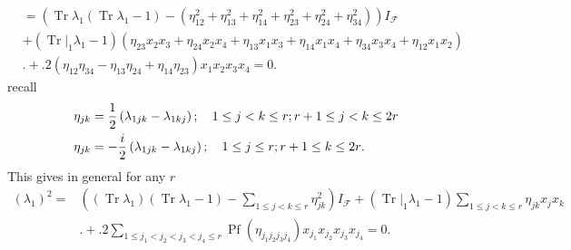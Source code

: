 \documentclass[aps, preprint]{revtex4}
\begin{document}
\begin{align} &  =\left (\ensuremath{\operatorname*{Tr}}\lambda _{1} \left (\ensuremath{\operatorname*{Tr}}\lambda _{1} -1\right ) -\left (\eta _{1 2}^{2} +\eta _{1 3}^{2} +\eta _{1 4}^{2} +\eta _{2 3}^{2} +\eta _{2 4}^{2} +\eta _{3 4}^{2}\right )\right ) I_{\mathcal{F}} \nonumber  \\
 &  +\left (\left .\ensuremath{\operatorname*{Tr}}\right \vert _{1} \lambda _{1} -1\right ) \left (\eta _{2 3} x_{2} x_{3} +\eta _{2 4} x_{2} x_{4} +\eta _{1 3} x_{1} x_{3} +\eta _{1 4} x_{1} x_{4} +\eta _{3 4} x_{3} x_{4} +\eta _{1 2} x_{1} x_{2}\right ) \nonumber  \\
 & . +.2 \left (\eta _{1 2} \eta _{3 4} -\eta _{1 3} \eta _{2 4} +\eta _{1 4} \eta _{2 3}\right ) x_{1} x_{2} x_{3} x_{4} =0.\end{align}recall
\begin{align}\eta _{j k} &  =\frac{1}{2} \left (\lambda _{1 j k} -\lambda _{1 k j}\right ) ;\text{\quad }1 \leq j <k \leq r ;r +1 \leq j <k \leq 2 r \\
\eta _{j k} &  = -\frac{i}{2} \left (\lambda _{1 j k} -\lambda _{1 k j}\right ) ;\text{\quad }1 \leq j \leq r ;r +1 \leq k \leq 2 r\text{.}\end{align}This gives in general for any $r$
\begin{align}\left (\lambda _{1}\right )^{2} = & \left (\left (\ensuremath{\operatorname*{Tr}}\lambda _{1}\right ) \left (\ensuremath{\operatorname*{Tr}}\lambda _{1} -1\right ) -\sum _{1 \leq j <k \leq r}\eta _{j k}^{2}\right ) I_{\mathcal{F}} +\left (\left .\ensuremath{\operatorname*{Tr}}\right \vert _{1} \lambda _{1} -1\right ) \sum _{1 \leq j <k \leq r}\eta _{j k} x_{j} x_{k} \nonumber  \\
 & . +.2 \sum _{1 \leq j_{1} <j_{2} <j_{3} <j_{4} \leq r}\ensuremath{\operatorname*{Pf}} \left (\eta _{j_{1} j_{2} j_{3} j_{4}}\right ) x_{j_{1}} x_{j_{2}} x_{j_{3}} x_{j_{4}} =0.\end{align}
\end{document}
